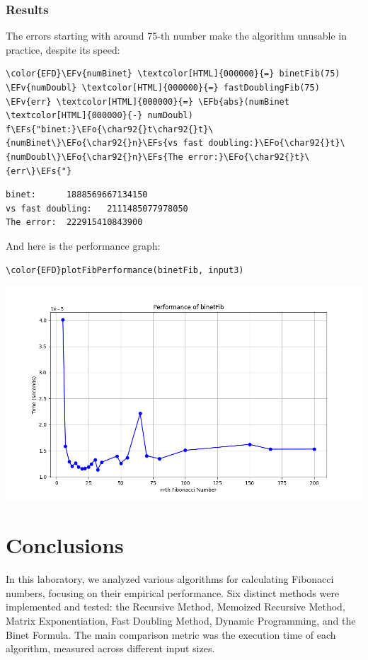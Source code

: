 \documentclass[a4paper,12pt]{article}
\newcommand{\EFs}[1]{\textcolor{EFs}{#1}} %
\newcommand{\EFb}[1]{\textcolor{EFb}{#1}} %
\newcommand{\EFv}[1]{\textcolor{EFv}{#1}} %
\newcommand{\EFo}[1]{\textcolor{EFo}{#1}} %
\begin{document}
\subsubsection{Results}
\label{sec:orgd829af3}
The errors starting with around 75-th number make the algorithm unusable in practice, despite its speed:
\begin{Code}
\begin{Verbatim}
\color{EFD}\EFv{numBinet} \textcolor[HTML]{000000}{=} binetFib(75)
\EFv{numDoubl} \textcolor[HTML]{000000}{=} fastDoublingFib(75)
\EFv{err} \textcolor[HTML]{000000}{=} \EFb{abs}(numBinet \textcolor[HTML]{000000}{-} numDoubl)
f\EFs{"binet:}\EFo{\char92{}t\char92{}t}\{numBinet\}\EFo{\char92{}n}\EFs{vs fast doubling:}\EFo{\char92{}t}\{numDoubl\}\EFo{\char92{}n}\EFs{The error:}\EFo{\char92{}t}\{err\}\EFs{"}
\end{Verbatim}
\end{Code}

\label{orgc8826f9}
\begin{verbatim}
binet:		1888569667134150
vs fast doubling:	2111485077978050
The error:	222915410843900
\end{verbatim}



And here is the performance graph:
\begin{Code}
\begin{Verbatim}
\color{EFD}plotFibPerformance(binetFib, input3)
\end{Verbatim}
\end{Code}

\begin{center}
\includegraphics[width=.9\linewidth]{binetFormulaFib.png}
\label{org0fb54c5}
\end{center}
\section{Conclusions}
\label{sec:org651ed86}
In this laboratory, we analyzed various algorithms for calculating Fibonacci numbers, focusing on their empirical performance. Six distinct methods were implemented and tested: the Recursive Method, Memoized Recursive Method, Matrix Exponentiation, Fast Doubling Method, Dynamic Programming, and the Binet Formula. The main comparison metric was the execution time of each algorithm, measured across different input sizes.
\end{document}
